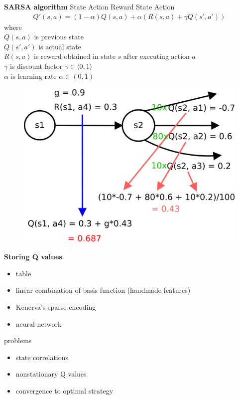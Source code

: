 \documentclass[xcolor=dvipsnames]{beamer}
\begin{document}
\begin{frame}{\bf SARSA algorithm}
State Action Reward State Action
\begin{align*}
Q'(s, a) = (1-\alpha)Q(s, a) + \alpha(R(s, a) + \gamma Q(s', a'))
\end{align*}
where \\
$Q(s, a)$ is previous state \\
$Q(s', a')$ is actual state \\
$R(s, a)$ is reward obtained in state $s$ after executing action $a$ \\
$\gamma$ is discount factor $\gamma \in \langle0, 1\rangle$ \\
$\alpha$ is learning rate $\alpha \in (0, 1)$
\begin{figure}[htbp]
  \centering
  \includegraphics[scale=0.17]{../../diagrams/sarsa_learning_detail.png}
\end{figure}


\end{frame}


\begin{frame}{\bf Storing Q values}

\begin{itemize}
 \item table
 \item linear combination of basis function (handmade features)
 \item Kenerva's sparse encoding
 \item neural network
\end{itemize}

problems
\begin{itemize}
 \item state correlations
 \item nonstationary Q values
 \item convergence to optimal strategy
\end{itemize}

\end{frame}
\end{document}
